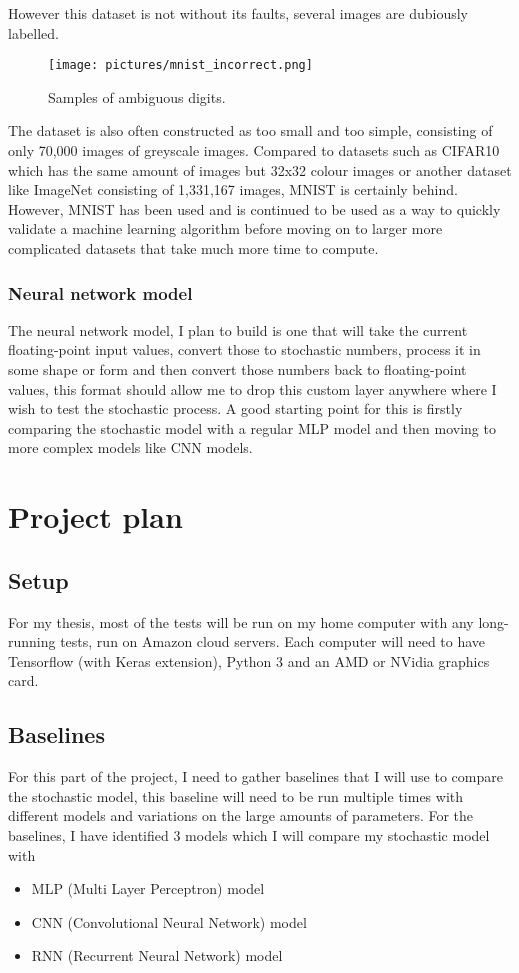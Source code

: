 \documentclass[a4paper,oneside,phd,etd]{BYUPhys}
\begin{document}
However this dataset is not without its faults, several images are dubiously labelled.
\begin{figure}[H]
\centering
\texttt{[image: pictures/mnist\_incorrect.png]}
\caption{Samples of ambiguous digits\cite{fig:mnist_incorrect}.}
\label{fig:incorrect_mnist}
\end{figure}
The dataset is also often constructed as too small and too simple, consisting of only 70,000 images of greyscale images. Compared to datasets such as CIFAR10 which has the same amount of images but 32x32 colour images or another dataset like ImageNet consisting of 1,331,167 images, MNIST is certainly behind. However, MNIST has been used and is continued to be used as a way to quickly validate a machine learning algorithm before moving on to larger more complicated datasets that take much more time to compute.

\subsection{Neural network model}
The neural network model, I plan to build is one that will take the current floating-point input values, convert those to stochastic numbers, process it in some shape or form and then convert those numbers back to floating-point values, this format should allow me to drop this custom layer anywhere where I wish to test the stochastic process. A good starting point for this is firstly comparing the stochastic model with a regular MLP model and then moving to more complex models like CNN models.

\chapter{Project plan}

\section{Setup}
For my thesis, most of the tests will be run on my home computer with any long-running tests, run on Amazon cloud servers. Each computer will need to have Tensorflow (with Keras extension), Python 3 and an AMD or NVidia graphics card.

\section{Baselines}
For this part of the project, I need to gather baselines that I will use to compare the stochastic model, this baseline will need to be run multiple times with different models and variations on the large amounts of parameters. For the baselines, I have identified 3 models which I will compare my stochastic model with
\begin{itemize}
    \itemsep0em
    \item MLP (Multi Layer Perceptron) model
    \item CNN (Convolutional Neural Network) model
    \item RNN (Recurrent Neural Network) model
\end{itemize}
\end{document}

